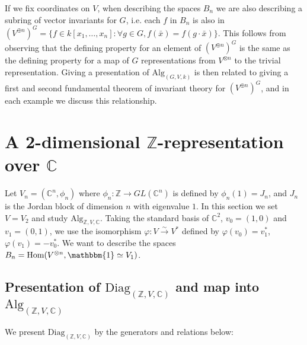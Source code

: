 \documentclass[11pt]{article} %
\begin{document}
If we fix coordinates on $V$, when describing the spaces $B_n$ we are also describing a subring of vector invariants for $G$, i.e. each $f$ in $B_n$ is also in $(V^{\oplus n})^G=\{f \in k[x_1,\ldots,x_n] : \forall g \in G, f(\bar{x}) = f(g \cdot \bar{x})\}$. This follows from observing that the defining property for an element of $(V^{\oplus n})^G$ is the same as the defining property for a map of $G$ representations from $V^{\otimes n}$ to the trivial representation. Giving a presentation of $\text{Alg}_{(G,V,k)}$ is then related to giving a first and second fundamental theorem of invariant theory for $(V^{\oplus n})^G$, and in each example we discuss this relationship.


\section{A 2-dimensional $\mathbb{Z}$-representation over $\mathbb{C}$}

Let $V_n=(\mathbb{C}^n,\phi_n)$ where $\phi_n: \mathbb{Z} \rightarrow GL(\mathbb{C}^n)$ is defined by $\phi_n(1)=J_n$, and $J_n$ is the Jordan block of dimension $n$ with eigenvalue $1$. In this section we set $V=V_2$ and study $\text{Alg}_{\mathbb{Z},V, \mathbb{C}}$. Taking the standard basis of $\mathbb{C}^2$, $v_0 = (1,0)$ and  $v_1 = (0,1)$, we use the isomorphism $\varphi:V \xrightarrow{\sim} V^{\ast}$ defined by $\varphi(v_0)=v_1^{\ast}$, $\varphi(v_1)=-v_0^{\ast}$. We want to describe the spaces $B_n = \text{Hom}(V^{\otimes n},\mathbbm{1} \simeq V_1)$.

\subsection {Presentation of $\text{Diag}_{(\mathbb{Z},V,\mathbb{C})}$ and map into $\text{Alg}_{(\mathbb{Z},V,\mathbb{C})}$}

\begin{mydef}
We present $\text{Diag}_{(\mathbb{Z},V,\mathbb{C})}$ by the generators and relations below:
\end{mydef}
\end{document}
